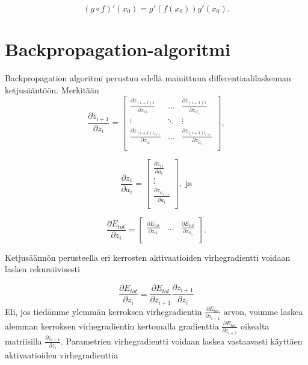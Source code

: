 \documentclass[11pt]{article}
\begin{document}
\begin{equation*}
(g \circ f)'(x_0)=g'(f(x_0))g'(x_0).
\end{equation*}

\section{Backpropagation-algoritmi}

Backpropagation algoritmi perustuu edellä mainittuun differentiaalilaskennan ketjusääntöön. Merkitään 
\begin{equation*}
\frac{\partial z_{i + 1}}{\partial  z_{i}} = \left[
\begin{matrix}
\frac{\partial z_{(i + 1)1}}{\partial z_{i1}} & \hdots & \frac{\partial z_{(i + 1)1}}{\partial z_{il_i}} \\
\vdots  & \ddots & \vdots  \\
\frac{\partial z_{(i + 1)l_{i + 1}}}{\partial z_{i1}} & \hdots  & \frac{\partial z_{(i + 1)l_{i + 1}}}{\partial z_{il_i}} \\
\end{matrix}
 \right],
\end{equation*}

\begin{equation*}
\frac{\partial z_{i}}{\partial  a_{i}} = \left[
\begin{matrix}
\frac{\partial z_{i1}}{\partial a_{i}} \\
 \vdots \\
\frac{\partial z_{il_{i + 1}}}{\partial a_{i}} \\
\end{matrix}
 \right], \mbox{ ja}
\end{equation*}

\begin{equation*}
\frac{\partial E_{tot}}{\partial  z_{i}} = \left[
\begin{matrix}
\frac{\partial E_{tot}}{\partial z_{i1}} & \hdots & \frac{\partial E_{tot}}{\partial z_{il_i}} \\
\end{matrix}
 \right].
\end{equation*}


Ketjusäännön perusteella eri kerrosten aktivaatioiden virhegradientti voidaan laskea rekursiivisesti

\begin{equation*}
\frac{\partial E_{tot}}{\partial  z_{i}} = \frac{\partial E_{tot}}{\partial  z_{i + 1}} \frac{\partial z_{i + 1}}{\partial  z_{i}}
\end{equation*}
Eli, jos tiedämme ylemmän kerroksen virhegradientin $ \frac{\partial E_{tot}}{\partial  z_{i + 1}}$ arvon, voimme laskea alemman kerroksen virhegradientin kertomalla gradienttia 
$\frac{\partial E_{tot}}{\partial  z_{i + 1}}$ oikealta matriisilla $ \frac{\partial z_{i + 1}}{\partial  z_{i}}$. Parametrien virhegradientti voidaan laskea vastaavasti käyttäen aktivaatioiden virhegradienttia
\end{document}
